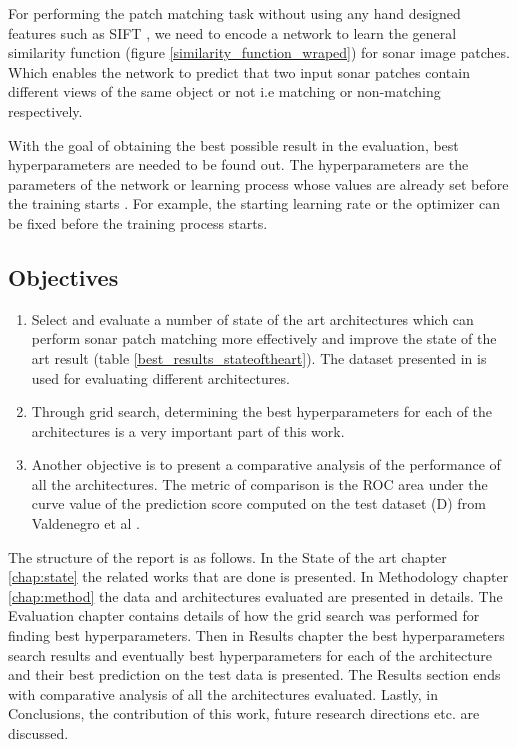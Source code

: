 For performing the patch matching task without using any hand designed features such as SIFT \cite{lowe2004distinctive}, we need to encode a network to learn the general
similarity function (figure \ref{similarity_function_wraped})
for sonar image patches. Which enables the network to predict that two input sonar patches contain different views of the same object or not i.e matching or non-matching respectively.

With the goal of obtaining the best possible result in the evaluation, best hyperparameters are needed to be found out.
The hyperparameters are the parameters of the network or learning process whose values are already set before the training starts \cite{wikihyper}. For example, the starting learning rate or the optimizer can be fixed before the training process starts. 

\subsection{Objectives}

\begin{enumerate}
 \item Select and evaluate a number of state of the art architectures which can perform sonar patch matching more effectively and improve the state of the art result (table \ref{best_results_stateoftheart}). The dataset presented in 
 \cite{stateoftheart} is used for evaluating different architectures. 
 \item Through grid search, determining the best hyperparameters for each of the architectures is a very important part of this work.
 \item Another objective is to present a comparative analysis of the performance of all the architectures. The metric of comparison is the ROC area under the curve value of the prediction score computed on the test dataset (D) from Valdenegro et al 
 \cite{stateoftheart}.
\end{enumerate}


The structure of the report is as follows. In the State of the art chapter \ref{chap:state} the related works that are done is presented. In Methodology chapter \ref{chap:method} the data and architectures evaluated are presented in details. The Evaluation chapter contains details of how the grid search was performed for finding best hyperparameters. Then in Results chapter the best hyperparameters search results and eventually best hyperparameters for each of the architecture and their best prediction
on the test data is presented. The Results section ends with comparative analysis of all the architectures evaluated. Lastly, in Conclusions, the contribution of this work, future research directions etc. are discussed.
